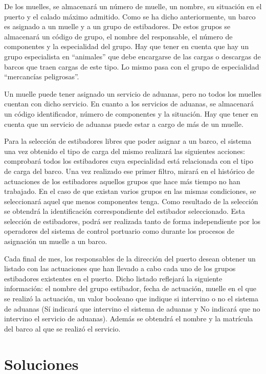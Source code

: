 \documentclass{db-practice}
\begin{document}
De los muelles, se almacenará un número de muelle, un nombre, su situación en el puerto y el calado máximo admitido. Como se ha dicho anteriormente, un barco es asignado a un muelle y a un grupo de estibadores. De estos grupos se almacenará un código de grupo, el nombre del responsable, el número de componentes y la especialidad del grupo. Hay que tener en cuenta que hay un grupo especialista en “animales” que debe encargarse de las cargas o descargas de barcos que traen cargas de este tipo. Lo mismo pasa con el grupo de especialidad “mercancías peligrosas”.

Un muelle puede tener asignado un servicio de aduanas, pero no todos los muelles cuentan con dicho servicio. En cuanto a los servicios de aduanas, se almacenará un código identificador, número de componentes y la situación. Hay que tener en cuenta que un servicio de aduanas puede estar a cargo de más de un muelle.

Para la selección de estibadores libres que poder asignar a un barco, el sistema una vez obtenido el tipo de carga del mismo realizará las siguientes acciones: comprobará todos los estibadores cuya especialidad está relacionada con el tipo de carga del barco. Una vez realizado ese primer filtro, mirará en el histórico de actuaciones de los estibadores aquellos grupos que hace más tiempo no han trabajado. En el caso de que existan varios grupos en las mismas condiciones, se seleccionará aquel que menos componentes tenga. Como resultado de la selección se obtendrá la identificación correspondiente del estibador seleccionado. Esta selección de estibadores, podrá ser realizada tanto de forma independiente por los operadores del sistema de control portuario como durante los procesos de asignación un muelle a un barco.

Cada final de mes, los responsables de la dirección del puerto desean obtener un listado con las actuaciones que han llevado a cabo cada uno de los grupos estibadores existentes en el puerto. Dicho listado reflejará la siguiente información: el nombre del grupo estibador, fecha de actuación, muelle en el que se realizó la actuación, un valor booleano que indique si intervino o no el sistema de aduanas (Sí indicará que intervino el sistema de aduanas y No indicará que no intervino el servicio de aduanas). Además se obtendrá el nombre y la matrícula del barco al que se realizó el servicio.

\section{Soluciones}
\end{document}
